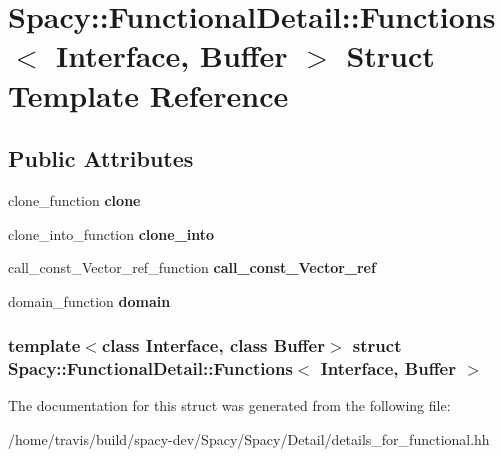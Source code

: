 \hypertarget{structSpacy_1_1FunctionalDetail_1_1Functions}{\section{\-Spacy\-:\-:\-Functional\-Detail\-:\-:\-Functions$<$ \-Interface, \-Buffer $>$ \-Struct \-Template \-Reference}
\label{structSpacy_1_1FunctionalDetail_1_1Functions}
}
\subsection*{\-Public \-Attributes}
\begin{DoxyCompactItemize}
\item 
\hypertarget{structSpacy_1_1FunctionalDetail_1_1Functions_a52cda20db610c8b385e65719af3b1565}{clone\-\_\-function {\bfseries clone}}\label{structSpacy_1_1FunctionalDetail_1_1Functions_a52cda20db610c8b385e65719af3b1565}

\item 
\hypertarget{structSpacy_1_1FunctionalDetail_1_1Functions_ae29481b789dd525183998857d65c548d}{clone\-\_\-into\-\_\-function {\bfseries clone\-\_\-into}}\label{structSpacy_1_1FunctionalDetail_1_1Functions_ae29481b789dd525183998857d65c548d}

\item 
\hypertarget{structSpacy_1_1FunctionalDetail_1_1Functions_abe5c269752e9a815ebe09f8eba9b584b}{call\-\_\-const\-\_\-\-Vector\-\_\-ref\-\_\-function {\bfseries call\-\_\-const\-\_\-\-Vector\-\_\-ref}}\label{structSpacy_1_1FunctionalDetail_1_1Functions_abe5c269752e9a815ebe09f8eba9b584b}

\item 
\hypertarget{structSpacy_1_1FunctionalDetail_1_1Functions_abc37946ca34bb3e09ae14076a6d34daf}{domain\-\_\-function {\bfseries domain}}\label{structSpacy_1_1FunctionalDetail_1_1Functions_abc37946ca34bb3e09ae14076a6d34daf}

\end{DoxyCompactItemize}
\subsubsection*{template$<$class \-Interface, class \-Buffer$>$ struct Spacy\-::\-Functional\-Detail\-::\-Functions$<$ Interface, Buffer $>$}



\-The documentation for this struct was generated from the following file\-:\begin{DoxyCompactItemize}
\item 
/home/travis/build/spacy-\/dev/\-Spacy/\-Spacy/\-Detail/details\-\_\-for\-\_\-functional.\-hh\end{DoxyCompactItemize}
